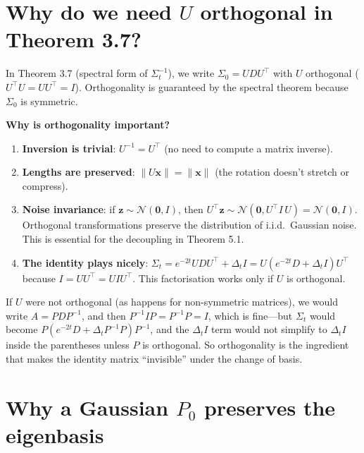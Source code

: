 \documentclass[11pt,a4paper]{article}
\newcommand{\Dt}{\Delta_t}
\begin{document}
\section{Why do we need $U$ orthogonal in Theorem 3.7?}
\label{sec:q14}

In Theorem 3.7 (spectral form of $\Sigma_t^{-1}$), we write $\Sigma_0 = UDU^\top$ with $U$ orthogonal ($U^\top U = UU^\top = I$).  Orthogonality is guaranteed by the spectral theorem because $\Sigma_0$ is symmetric.

\textbf{Why is orthogonality important?}
\begin{enumerate}[nosep]
  \item \textbf{Inversion is trivial}: $U^{-1} = U^\top$ (no need to compute a matrix inverse).
  \item \textbf{Lengths are preserved}: $\|U\mathbf{x}\| = \|\mathbf{x}\|$ (the rotation doesn't stretch or compress).
  \item \textbf{Noise invariance}: if $\mathbf{z} \sim \mathcal{N}(\mathbf{0}, I)$, then $U^\top\mathbf{z} \sim \mathcal{N}(\mathbf{0}, U^\top I\, U) = \mathcal{N}(\mathbf{0}, I)$.  Orthogonal transformations preserve the distribution of i.i.d.\ Gaussian noise.  This is essential for the decoupling in Theorem 5.1.
  \item \textbf{The identity plays nicely}: $\Sigma_t = e^{-2t}UDU^\top + \Dt I = U(e^{-2t}D + \Dt I)U^\top$ because $I = UU^\top = UIU^\top$.  This factorisation works only if $U$ is orthogonal.
\end{enumerate}

If $U$ were not orthogonal (as happens for non-symmetric matrices), we would write $A = PDP^{-1}$, and then $P^{-1}IP = P^{-1}P = I$, which is fine---but $\Sigma_t$ would become $P(e^{-2t}D + \Dt P^{-1}P)P^{-1}$, and the $\Dt I$ term would not simplify to $\Dt I$ inside the parentheses unless $P$ is orthogonal.  So orthogonality is the ingredient that makes the identity matrix ``invisible'' under the change of basis.


\section{Why a Gaussian $P_0$ preserves the eigenbasis}
\label{sec:q15}
\end{document}
